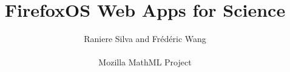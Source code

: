\documentclass{report}
\begin{document}
\title{FirefoxOS Web Apps for Science}
\author{
Raniere Silva and Frédéric Wang\\
\\
Mozilla MathML Project}



\maketitle

\tableofcontents








 
\end{document}
